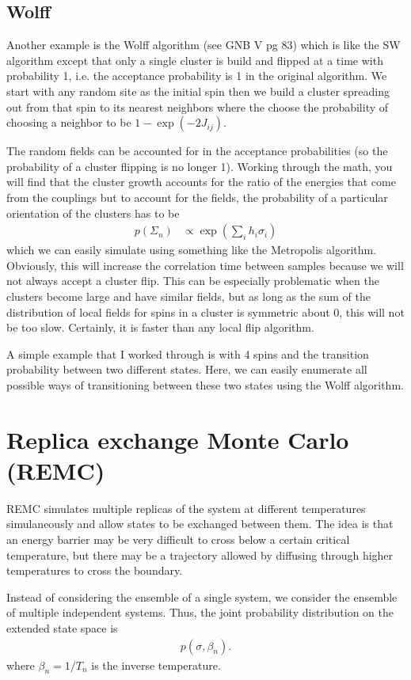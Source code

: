 \documentclass[aps,prl,twocolumn]{revtex4-1}
\begin{document}
\subsection{Wolff}
Another example is the Wolff algorithm (see GNB V pg 83) which is like the SW algorithm except that only a single cluster is build and flipped at a time with probability 1, i.e. the acceptance probability is 1 in the original algorithm. We start with any random site as the initial spin then we build a cluster spreading out from that spin to its nearest neighbors where the choose the probability of choosing a neighbor to be $1-\exp(-2J_{ij})$.

The random fields can be accounted for in the acceptance probabilities (so the probability of a cluster flipping is no longer 1). Working through the math, you will find that the cluster growth accounts for the ratio of the energies that come from the couplings but to account for the fields, the probability of a particular orientation of the clusters has to be
\begin{align}
	p(\Sigma_n) &\propto \exp\left(\sum_i h_i\sigma_i\right)
\end{align}
which we can easily simulate using something like the Metropolis algorithm. Obviously, this will increase the correlation time between samples because we will not always accept a cluster flip. This can be especially problematic when the clusters become large and have similar fields, but as long as the sum of the distribution of local fields for spins in a cluster is symmetric about 0, this will not be too slow. Certainly, it is faster than any local flip algorithm.

A simple example that I worked through is with 4 spins and the transition probability between two different states. Here, we can easily enumerate all possible ways of transitioning between these two states using the Wolff algorithm.

\section{Replica exchange Monte Carlo (REMC)}
REMC simulates multiple replicas of the system at different temperatures simulaneously and allow states to be exchanged between them. The idea is that an energy barrier may be very difficult to cross below a certain critical temperature, but there may be a trajectory allowed by diffusing through higher temperatures to cross the boundary.

Instead of considering the ensemble of a single system, we consider the ensemble of multiple independent systems. Thus, the joint probability distribution on the extended state space is
\begin{align}
	p(\sigma,\beta_n).
\end{align}
where $\beta_n = 1/T_n$ is the inverse temperature.
\end{document}
